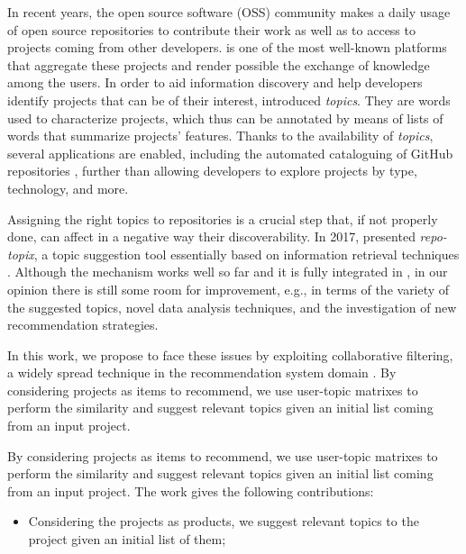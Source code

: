 In recent years, the open source software (OSS) community 
makes a daily usage of open source repositories to 
contribute their work as well as to access to projects 
coming from other developers. \GH is one of the most 
well-known platforms that aggregate these projects and 
render possible the exchange of knowledge among the users.
%
In order to aid information discovery and help 
developers identify projects that can be of their interest, \GH introduced \emph{topics}. They are 
words used to characterize projects, which thus can be 
annotated by means of lists of words that summarize projects' features. Thanks 
to the availability of \emph{topics}, several applications are enabled, 
including the automated cataloguing of GitHub repositories \cite{davidlo1}, 
further than allowing developers to explore projects by type, technology, and 
more.

Assigning the right topics to \GH repositories is a crucial step that, if not 
properly done, can affect in a negative way their discoverability. In 
2017, \GH presented \textit{repo-topix}, a topic suggestion tool essentially 
based on information retrieval techniques \cite{noauthor_topic_nodate}. 
Although the mechanism works well so far and it is fully integrated in \GH, in our 
opinion there is still some room for improvement, e.g., in terms of the variety 
of the suggested topics, novel data analysis techniques, and the investigation of new recommendation strategies.

In this work, we propose to face these issues by exploiting collaborative filtering, a widely spread technique in the recommendation system domain \cite{}. By considering \GH projects as items to recommend,  we use user-topic matrixes to perform the similarity and suggest relevant topics given an initial list coming from an input project. 

By considering \GH projects as items to recommend,  we use user-topic matrixes to perform the similarity and suggest relevant topics given an initial list coming from an input project. 
The work gives the following contributions:
\begin{itemize}
\item Considering the \GH projects as products, we suggest relevant topics to the project given an initial list of them;
\end{itemize}